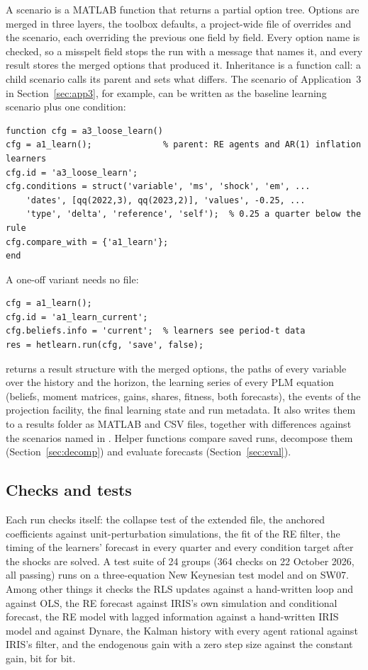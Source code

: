\documentclass[pdflatex,sn-basic]{sn-jnl}
\DeclareRobustCommand{\code}[1]{\texttt{\detokenize{#1}}}
\begin{document}
A scenario is a MATLAB function that returns a partial option tree. Options are merged in three
layers, the toolbox defaults, a project-wide file of overrides and the scenario, each overriding
the previous one field by field. Every option name is checked, so a misspelt field stops the run
with a message that names it, and every result stores the merged options that produced it.
Inheritance is a function call: a child scenario calls its parent and sets what differs. The
scenario of Application~3 in Section~\ref{sec:app3}, for example, can be written as the baseline
learning scenario plus one condition:
\begin{lstlisting}
function cfg = a3_loose_learn()
cfg = a1_learn();              % parent: RE agents and AR(1) inflation learners
cfg.id = 'a3_loose_learn';
cfg.conditions = struct('variable', 'ms', 'shock', 'em', ...
    'dates', [qq(2022,3), qq(2023,2)], 'values', -0.25, ...
    'type', 'delta', 'reference', 'self');  % 0.25 a quarter below the rule
cfg.compare_with = {'a1_learn'};
end
\end{lstlisting}
A one-off variant needs no file:
\begin{lstlisting}
cfg = a1_learn();
cfg.id = 'a1_learn_current';
cfg.beliefs.info = 'current';  % learners see period-t data
res = hetlearn.run(cfg, 'save', false);
\end{lstlisting}
\code{hetlearn.run} returns a result structure with the merged options, the paths of every
variable over the history and the horizon, the learning series of every PLM equation (beliefs,
moment matrices, gains, shares, fitness, both forecasts), the events of the projection facility,
the final learning state and run metadata. It also writes them to a results folder as MATLAB and
CSV files, together with differences against the scenarios named in \code{compare_with}.
Helper functions compare saved runs, decompose them (Section~\ref{sec:decomp}) and evaluate
forecasts (Section~\ref{sec:eval}).

\subsection{Checks and tests}\label{sec:tests}

Each run checks itself: the collapse test of the extended file, the anchored coefficients against
unit-perturbation simulations, the fit of the RE filter, the timing of the learners' forecast in
every quarter and every condition target after the shocks are solved. A test suite of 24 groups
(364 checks on 22 October 2026, all passing) runs on a three-equation New Keynesian test model
and on SW07. Among other things it checks the RLS updates against a hand-written loop and against
OLS, the RE forecast against IRIS's own simulation and conditional forecast, the RE model with
lagged information against a hand-written IRIS model and against Dynare, the Kalman history with
every agent rational against IRIS's filter, and the endogenous gain with a zero step size against
the constant gain, bit for bit.
\end{document}
